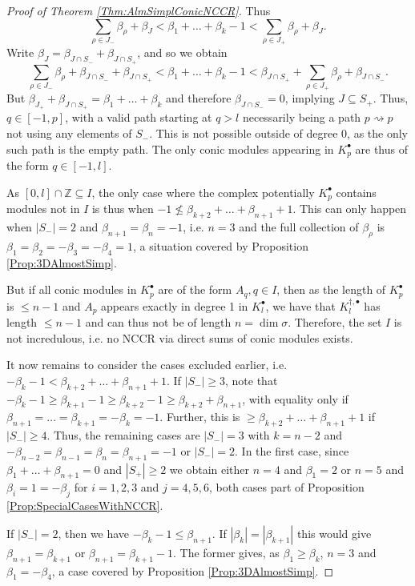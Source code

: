 \documentclass[reqno, 12pt]{amsart}
\theoremstyle{definition}
\numberwithin{equation}{section}
\newcommand{\Z}{\mathbb{Z}}
\begin{document}
\begin{proof}[Proof of Theorem \ref{Thm:AlmSimplConicNCCR}]
Thus\[
\sum_{\rho\in J_-}\beta_\rho +\beta_J<\beta_1+\dots+\beta_k-1<\sum_{\rho\in J_+}\beta_\rho+\beta_J.
\]
Write $\beta_J=\beta_{J\cap S_-}+\beta_{J\cap S_+}$, and so we obtain\[
\sum_{\rho\in J_-}\beta_\rho+\beta_{J\cap S_-}+\beta_{J\cap S_+}<\beta_1+\dots+\beta_{k}-1<\beta_{J\cap S_+}+\sum_{\rho\in J_+}\beta_\rho+\beta_{J\cap S_-}.
\]
 But $\beta_{J_+}+\beta_{J\cap S_+}=\beta_1+\dots+\beta_k$ and therefore $\beta_{J\cap S_-}=0$, implying $J\subseteq S_+$. Thus, $q\in[-1,p]$, with a valid path starting at $q>l$ necessarily being a path $p\rightsquigarrow p$ not using any elements of $S_-$. This is not possible outside of degree 0, as the only such path is the empty path. The only conic modules appearing in $K_p^\bullet$ are thus of the form $q\in [-1,l]$. 
 
 As $[0,l]\cap \Z\subseteq I$, the only case where the complex potentially $K_p^\bullet$ contains modules not in $I$ is thus when $-1\not\le \beta_{k+2}+\dots+\beta_{n+1}+1$. This can only happen when $|S_-|=2$ and $\beta_{n+1}=\beta_n=-1$, i.e. $n=3$ and the full collection of $\beta_\rho$ is $\beta_1=\beta_2=-\beta_3=-\beta_4=1$, a situation covered by Proposition \ref{Prop:3DAlmostSimp}.

 But if all conic modules in $K_p^\bullet$ are of the form $A_q, q\in I$, then as the length of $K_p^\bullet$ is $\le n-1$ and $A_p$ appears exactly in degree 1 in $K_l^\bullet$, we have that $K_l^{\dagger,\bullet}$ has length $\le n-1$ and can thus not be of length $n=\dim\sigma$. Therefore, the set $I$ is not incredulous, i.e. no NCCR via direct sums of conic modules exists.

It now remains to consider the cases excluded earlier, i.e. $-\beta_k-1<\beta_{k+2}+\dots+\beta_{n+1}+1$. If $|S_-|\ge 3$, note that $-\beta_k-1\ge\beta_{k+1}-1\ge \beta_{k+2}-1\ge \beta_{k+2}+\beta_{n+1}$, with equality only if $\beta_{n+1}=\dots=\beta_{k+1}=-\beta_k=-1$. Further, this is $\ge \beta_{k+2}+\dots+\beta_{n+1}+1$ if $|S_-|\ge 4$. Thus, the remaining cases are $|S_-|=3$ with $k=n-2$ and $-\beta_{n-2}=\beta_{n-1}=\beta_{n}=\beta_{n+1}=-1$ or $|S_-|=2$. In the first case, since $\beta_1+\dots+\beta_{n+1}=0$ and $|S_+|\ge 2$ we obtain either $n=4$ and $\beta_1=2$ or $n=5$ and $\beta_i=1=-\beta_j$ for $i=1,2,3$ and $j=4,5,6$, both cases part of Proposition \ref{Prop:SpecialCasesWithNCCR}.

If $|S_-|=2$, then we have $-\beta_k-1\le \beta_{n+1}$. If
$|\beta_k|=|\beta_{k+1}|$ this would give $\beta_{n+1}=\beta_{k+1}$ or $\beta_{n+1}=\beta_{k+1}-1$. The former gives, as $\beta_1\ge \beta_k$, $n=3$ and $\beta_1=-\beta_4$, a case covered by Proposition \ref{Prop:3DAlmostSimp}.


\end{proof}
\end{document}
